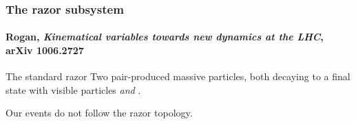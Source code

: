\documentclass[ukenglish]{beamer}
\begin{document}
\begin{frame}
    \frametitle{The razor subsystem}
    \framesubtitle{Rogan, \emph{Kinematical variables towards new dynamics
    at the LHC}, arXiv 1006.2727}
    \begin{block}{The standard razor}
        Two pair-produced massive particles, both decaying to a final state with
        visible particles \emph{and} \met.
    \end{block}
    \alert{Our events do not follow the razor topology.}

\end{frame}
\end{document}
